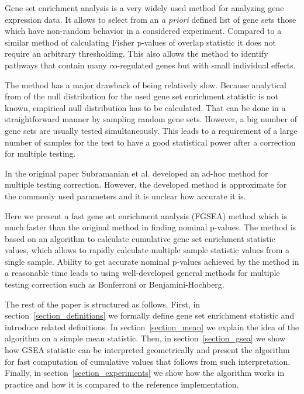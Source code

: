 \documentclass[runningheads,a4paper]{llncs}
\begin{document}
Gene set enrichment analysis is a very widely used method for analyzing 
gene expression data. It allows to select from an \emph{a priori} defined
list of gene sets those
which have non-random behavior in a considered experiment. Compared
to a similar method of calculating Fisher p-values of overlap statistic
it does not require an arbitrary thresholding. This also allows the method
to identify pathways that contain many co-regulated genes but with small 
individual effects.

The method has a major drawback of being relatively slow. Because analytical
from of the null distribution for the used gene set enrichment statistic 
is not known, empirical null distribution has to be calculated. That can be
done in a straightforward manner by sampling random gene sets. However,
a big number of gene sets are usually tested simultaneously. This leads to
a requirement of a large number of samples 
for the test to have a good statistical power after a correction for 
multiple testing.

In the original paper \cite{Subramanian2005} Subramanian et al. developed
an ad-hoc method for multiple testing correction.
However, the developed method is approximate for the commonly used
parameters and it is unclear how accurate it is.

Here we present a fast gene set enrichment analysis (FGSEA) method 
which is much faster than the original method \cite{Subramanian2005}
in finding nominal p-values. The method is based on an
algorithm to calculate cumulative gene set enrichment statistic
values, which allows to rapidly calculate multiple sample
statistic values from a single sample. Ability to get accurate nominal p-values
achieved by the method in a reasonable time leads to using
well-developed general methods for multiple testing
correction such as Bonferroni or Benjamini-Hochberg.

The rest of the paper is structured as follows. First,
in section~\ref{section_definitions} we formally define
gene set enrichment statistic and introduce related definitions.
In section~\ref{section_mean}
we explain the idea of the algorithm on a simple mean statistic.
Then, in section~\ref{section_gsea} we show how GSEA statistic
can be interpreted geometrically and present the algorithm
for fast computation of cumulative values that 
follows from such interpretation. Finally,
in section~\ref{section_experiments} we show how the algorithm works
in practice and how it is compared to the reference implementation.
\end{document}
